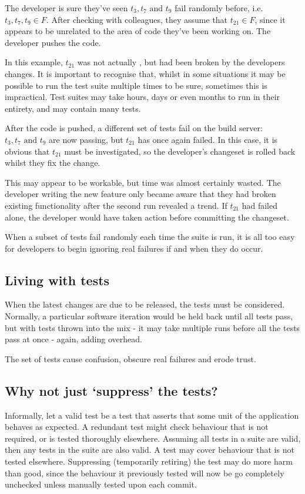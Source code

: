 The developer is sure they’ve seen $t_{3}, t_{7} \text{ and } t_{9}$ fail randomly before, i.e. $t_{3}, t_{7}, t_{9} \in F$. After checking with colleagues, they assume that $t_{21} \in F$, since it appears to be unrelated to the area of code they’ve been working on. The developer pushes the code.

In this example, $t_{21}$ was not actually \flaky, but had been broken by the developers changes. It is important to recognise that, whilst in some situations it may be possible to run the test suite multiple times to be sure, sometimes this is impractical. Test suites may take hours, days or even months to run in their entirety, and may contain many \flaky tests.

After the code is pushed, a different set of tests fail on the build server: $t_{3}, t_{7} \text{ and } t_{9}$ are now passing, but $t_{21}$ has once again failed. In this case, it is obvious that $t_{21}$ must be investigated, so the developer’s changeset is rolled back whilst they fix the change.

This may appear to be workable, but time was almost certainly wasted. The developer writing the new feature only became aware that they had broken existing functionality after the second run revealed a trend. If $t_{21}$ had failed alone, the developer would have taken action before committing the changeset.

When a subset of tests fail randomly each time the suite is run, it is all too easy for developers to begin ignoring real failures if and when they do occur.

\subsection{Living with \flaky tests}

When the latest changes are due to be released, the \flaky tests must be considered. Normally, a particular software iteration would be held back until all tests pass, but with \flaky tests thrown into the mix - it may take multiple runs before all the tests pass at once - again, adding overhead.

The set of \flaky tests cause confusion, obscure real failures and erode trust.

\subsection{Why not just ‘suppress’ the \flaky tests?}

Informally, let a valid test be a test that asserts that some unit of the application behaves as expected. A redundant test might check behaviour that is not required, or is tested thoroughly elsewhere. Assuming all tests in a suite are valid, then any \flaky tests in the suite are also valid. A \flaky test may cover behaviour that is not tested elsewhere. Suppressing (temporarily retiring) the \flaky test may do more harm than good, since the behaviour it previously tested will now be go completely unchecked unless manually tested upon each commit.

